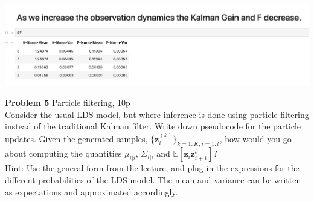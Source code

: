 \documentclass[12pt]{article}
\begin{document}
\begin{center}
	\includegraphics[width=1\linewidth]{figures/problem_4_7.png} 
\end{center}

\noindent \textbf{Problem 5 }  Particle filtering, 10p\\%
Consider the usual LDS model, but where inference is done using particle filtering instead of the traditional Kalman filter. Write down pseudocode for the particle updates. Given the generated samples, $\{\mathbf{z}_i^{(k)}\}_{k=1:K, i=1:t}$, how would you go about computing the quantities $\mu_{i|i}$, $\Sigma_{i|i}$ and $\mathbb{E}[\mathbf{z}_i \mathbf{z}_{i+1}^t]$?\\
Hint: Use the general form from the lecture, and plug in the expressions for the different probabilities of the LDS model. The mean and variance can be written as expectations and approximated accordingly.
\end{document}
